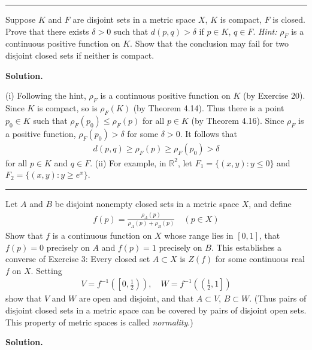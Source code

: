 \documentclass[12pt]{article}
\theoremstyle{definition}
\begin{document}
\bigskip\noindent\hrule\bigskip

Suppose $K$ and $F$ are disjoint sets in a metric space $X$, $K$ is compact, $F$ is closed. Prove that there exists $\delta>0$ such that $d(p,q)>\delta$ if $p\in K$, $q\in F$. \textit{Hint:} $\rho_F$ is a continuous positive function on $K$.
Show that the conclusion may fail for two disjoint closed sets if neither is compact.

\smallskip
\noindent\textbf{Solution.}\quad

(i) Following the hint, $\rho_F$ is a continuous positive function on $K$ (by Exercise 20). Since $K$ is compact, so is $\rho_F(K)$ (by Theorem 4.14). Thus there is a point $p_0\in K$ such that $\rho_F(p_0)\le\rho_F(p)$ for all $p\in K$ (by Theorem 4.16). Since $\rho_F$ is a positive function, $\rho_F(p_0)>\delta$ for some $\delta>0$. It follows that
\begin{align*}
d(p,q)\ge\rho_F(p)\ge\rho_F(p_0)>\delta
\end{align*}
for all $p\in K$ and $q\in F$.
(ii) For example, in $\mathbb{R}^2$, let $F_1=\{(x,y):y\le 0\}$ and $F_2=\{(x,y):y\ge e^x\}$.



\bigskip\noindent\hrule\bigskip

Let $A$ and $B$ be disjoint nonempty closed sets in a metric space $X$, and define
\begin{align*}
f(p)=\frac{\rho_A(p)}{\rho_A(p)+\rho_B(p)}\quad(p\in X)
\end{align*}
Show that $f$ is a continuous function on $X$ whose range lies in $[0,1]$, that $f(p)=0$ precisely on $A$ and $f(p)=1$ precisely on $B$. This establishes a converse of Exercise 3: Every closed set $A\subset X$ is $Z(f)$ for some continuous real $f$ on $X$. Setting
\begin{align*}
V=f^{-1}\left(\left[0,\tfrac{1}{2}\right)\right),\quad
W=f^{-1}\left(\left(\tfrac{1}{2},1\right]\right)
\end{align*}
show that $V$ and $W$ are open and disjoint, and that $A\subset V$, $B\subset W$. (Thus pairs of disjoint closed sets in a metric space can be covered by pairs of disjoint open sets. This property of metric spaces is called \textit{normality}.)

\smallskip
\noindent\textbf{Solution.}\quad
\end{document}
